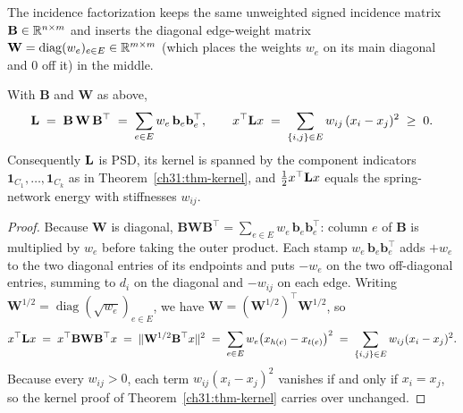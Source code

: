 The incidence factorization keeps the same unweighted signed incidence matrix $\mathbf{B} \in \mathbb{R}^{n\times m}$ and inserts the diagonal edge-weight matrix $\mathbf{W} = \operatorname{diag}(w_e)_{e\in E} \in \mathbb{R}^{m\times m}$ (which places the weights $w_e$ on its main diagonal and $0$ off it) in the middle.

\begin{theorem}\label{ch31:thm-weighted}
With $\mathbf{B}$ and $\mathbf{W}$ as above,
\[
  \mathbf{L} \;=\; \mathbf{B}\, \mathbf{W}\, \mathbf{B}^\top
  \;=\; \sum_{e\in E} w_e\, \mathbf{b}_e\mathbf{b}_e^\top,
  \qquad
  x^\top \mathbf{L} x \;=\; \sum_{\{i,j\}\in E} w_{ij}\,(x_i - x_j)^2 \;\ge\; 0 .
\]
Consequently $\mathbf{L}$ is PSD, its kernel is spanned by the component indicators $\mathbf{1}_{C_1},\dots,\mathbf{1}_{C_k}$ as in Theorem~\ref{ch31:thm-kernel}, and $\tfrac12 x^\top\mathbf{L} x$ equals the spring-network energy with stiffnesses $w_{ij}$.
\end{theorem}

\begin{proof}
Because $\mathbf{W}$ is diagonal, $\mathbf{B}\mathbf{W}\mathbf{B}^\top = \sum_{e\in E} w_e\,\mathbf{b}_e\mathbf{b}_e^\top$: column $e$ of $\mathbf{B}$ is multiplied by $w_e$ before taking the outer product. Each stamp $w_e\,\mathbf{b}_e\mathbf{b}_e^\top$ adds $+w_e$ to the two diagonal entries of its endpoints and puts $-w_e$ on the two off-diagonal entries, summing to $d_i$ on the diagonal and $-w_{ij}$ on each edge. Writing $\mathbf{W}^{1/2} = \operatorname{diag}(\sqrt{w_e})_{e\in E}$, we have $\mathbf{W} = (\mathbf{W}^{1/2})^\top \mathbf{W}^{1/2}$, so
\[
  x^\top \mathbf{L} x
  \;=\; x^\top \mathbf{B}\mathbf{W}\mathbf{B}^\top x
  \;=\; \lVert\mathbf{W}^{1/2}\mathbf{B}^\top x\rVert^2
  \;=\; \sum_{e\in E} w_e \bigl(x_{h(e)} - x_{t(e)}\bigr)^2
  \;=\; \sum_{\{i,j\}\in E} w_{ij}(x_i - x_j)^2 .
\]
Because every $w_{ij}>0$, each term $w_{ij}(x_i - x_j)^2$ vanishes if and only if $x_i = x_j$, so the kernel proof of Theorem~\ref{ch31:thm-kernel} carries over unchanged.
\end{proof}


